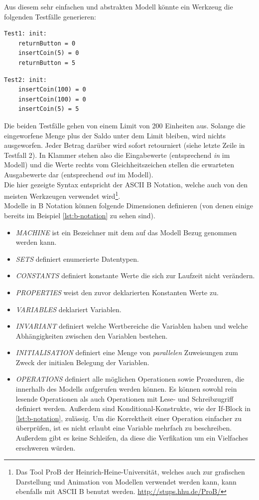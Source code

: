 Aus diesem sehr einfachen und abstrakten Modell könnte ein Werkzeug die folgenden Testfälle generieren:\\

\begin{verbatim}
Test1: init:
	returnButton = 0
	insertCoin(5) = 0
	returnButton = 5
\end{verbatim}

\begin{verbatim}
Test2: init:
	insertCoin(100) = 0
	insertCoin(100) = 0
	insertCoin(5) = 5
\end{verbatim}

Die beiden Testfälle gehen von einem Limit von 200 Einheiten aus. Solange die eingeworfene Menge plus der Saldo unter dem Limit bleiben, wird nichts ausgeworfen. Jeder Betrag darüber wird sofort retourniert (siehe letzte Zeile in Testfall 2). In Klammer stehen also die Eingabewerte (entsprechend \textit{in} im Modell) und die Werte rechts vom Gleichheitszeichen stellen die erwarteten Ausgabewerte dar (entsprechend \textit{out} im Modell).\\
Die hier gezeigte Syntax entspricht der ASCII B Notation, welche auch von den meisten Werkzeugen verwendet wird\footnote{Das Tool ProB der Heinrich-Heine-Universität, welches auch zur grafischen Darstellung und Animation von Modellen verwendet werden kann, kann ebenfalls mit ASCII B benutzt werden. \url{http://stups.hhu.de/ProB/}}.\\

Modelle in B Notation können folgende Dimensionen definieren (von denen einige bereits im Beispiel \ref{lst:b-notation} zu sehen sind).

\begin{itemize}
\item \textit{MACHINE} ist ein Bezeichner mit dem auf das Modell Bezug genommen werden kann.
\item \textit{SETS} definiert enumerierte Datentypen.
\item \textit{CONSTANTS} definiert konstante Werte die sich zur Laufzeit nicht verändern.
\item \textit{PROPERTIES} weist den zuvor deklarierten Konstanten Werte zu.
\item \textit{VARIABLES} deklariert Variablen.
\item \textit{INVARIANT} definiert welche Wertbereiche die Variablen haben und welche Abhängigkeiten zwischen den Variablen bestehen.
\item \textit{INITIALISATION} definiert eine Menge von \textit{parallelen} Zuweisungen zum Zweck der initialen Belegung der Variablen.
\item \textit{OPERATIONS} definiert alle möglichen Operationen sowie Prozeduren, die innerhalb des Modells aufgerufen werden können. Es können sowohl rein lesende Operationen als auch Operationen mit Lese- und Schreibzugriff definiert werden. Außerdem sind Konditional-Konstrukte, wie der If-Block in \ref{lst:b-notation}, zulässig. Um die Korrektheit einer Operation einfacher zu überprüfen, ist es nicht erlaubt eine Variable mehrfach zu beschreiben. Außerdem gibt es keine Schleifen, da diese die Verfikation um ein Vielfaches erschweren würden.
\end{itemize}

